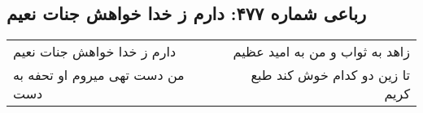 \begin{center}
\section*{رباعی شماره ۴۷۷: دارم ز خدا خواهش جنات نعیم}
\label{sec:sh477}
\begin{longtable}{l p{0.5cm} r}
دارم ز خدا خواهش جنات نعیم
&&
زاهد به ثواب و من به امید عظیم
\\
من دست تهی میروم او تحفه به دست
&&
تا زین دو کدام خوش کند طبع کریم
\\
\end{longtable}
\end{center}
